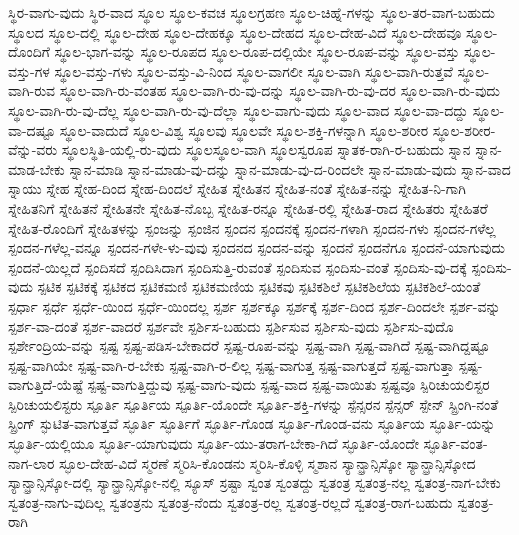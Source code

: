 {ಸ್ಥಿರ-ವಾಗು-ವುದು
ಸ್ಥಿರ-ವಾದ
ಸ್ಥೂಲ
ಸ್ಥೂಲ-ಕವಚ
ಸ್ಥೂಲಗ್ರಹಣ
ಸ್ಥೂಲ-ಚಿಹ್ನೆ-ಗಳನ್ನು
ಸ್ಥೂಲ-ತರ-ವಾಗ-ಬಹುದು
ಸ್ಥೂಲದ
ಸ್ಥೂಲ-ದಲ್ಲಿ
ಸ್ಥೂಲ-ದೇಹ
ಸ್ಥೂಲ-ದೇಹಕ್ಕೂ
ಸ್ಥೂಲ-ದೇಹದ
ಸ್ಥೂಲ-ದೇಹ-ವಿದೆ
ಸ್ಥೂಲ-ದೇಹವೂ
ಸ್ಥೂಲ-ದೊಂದಿಗೆ
ಸ್ಥೂಲ-ಭಾಗ-ವನ್ನು
ಸ್ಥೂಲ-ರೂಪದ
ಸ್ಥೂಲ-ರೂಪ-ದಲ್ಲಿಯೇ
ಸ್ಥೂಲ-ರೂಪ-ವನ್ನು
ಸ್ಥೂಲ-ವಸ್ತು
ಸ್ಥೂಲ-ವಸ್ತು-ಗಳ
ಸ್ಥೂಲ-ವಸ್ತು-ಗಳು
ಸ್ಥೂಲ-ವಸ್ತು-ವಿ-ನಿಂದ
ಸ್ಥೂಲ-ವಾಗಲೀ
ಸ್ಥೂಲ-ವಾಗಿ
ಸ್ಥೂಲ-ವಾಗಿ-ರುತ್ತವೆ
ಸ್ಥೂಲ-ವಾಗಿ-ರುವ
ಸ್ಥೂಲ-ವಾಗಿ-ರು-ವಂತಹ
ಸ್ಥೂಲ-ವಾಗಿ-ರು-ವು-ದನ್ನು
ಸ್ಥೂಲ-ವಾಗಿ-ರು-ವು-ದರ
ಸ್ಥೂಲ-ವಾಗಿ-ರು-ವುದು
ಸ್ಥೂಲ-ವಾಗಿ-ರು-ವು-ದೆಲ್ಲ
ಸ್ಥೂಲ-ವಾಗಿ-ರು-ವು-ದೆಲ್ಲಾ
ಸ್ಥೂಲ-ವಾಗು-ವುದು
ಸ್ಥೂಲ-ವಾದ
ಸ್ಥೂಲ-ವಾ-ದದ್ದು
ಸ್ಥೂಲ-ವಾ-ದಷ್ಟೂ
ಸ್ಥೂಲ-ವಾದುದೆ
ಸ್ಥೂಲ-ವಿಶ್ವ
ಸ್ಥೂಲವು
ಸ್ಥೂಲವೇ
ಸ್ಥೂಲ-ಶಕ್ತಿ-ಗಳನ್ನಾಗಿ
ಸ್ಥೂಲ-ಶರೀರ
ಸ್ಥೂಲ-ಶರೀರ-ವೆನ್ನು-ವರು
ಸ್ಥೂಲಸ್ಥಿತಿ-ಯಲ್ಲಿ-ರು-ವುದು
ಸ್ಥೂಲಸ್ಥೂಲ-ವಾಗಿ
ಸ್ಥೂಲಸ್ವರೂಪ
ಸ್ನಾತಕ-ರಾಗಿ-ರ-ಬಹುದು
ಸ್ನಾನ
ಸ್ನಾನ-ಮಾಡ-ಬೇಕು
ಸ್ನಾನ-ಮಾಡಿ
ಸ್ನಾನ-ಮಾಡು-ವು-ದನ್ನು
ಸ್ನಾನ-ಮಾಡು-ವು-ದ-ರಿಂದಲೇ
ಸ್ನಾನ-ಮಾಡು-ವುದು
ಸ್ನಾನ-ವಾದ
ಸ್ನಾಯು
ಸ್ನೇಹ
ಸ್ನೇಹ-ದಿಂದ
ಸ್ನೇಹ-ದಿಂದಲೆ
ಸ್ನೇಹಿತ
ಸ್ನೇಹಿತನ
ಸ್ನೇಹಿತ-ನಂತೆ
ಸ್ನೇಹಿತ-ನನ್ನು
ಸ್ನೇಹಿತ-ನಿ-ಗಾಗಿ
ಸ್ನೇಹಿತನಿಗೆ
ಸ್ನೇಹಿತನೆ
ಸ್ನೇಹಿತನೇ
ಸ್ನೇಹಿತ-ನೊಬ್ಬ
ಸ್ನೇಹಿತ-ರನ್ನೂ
ಸ್ನೇಹಿತ-ರಲ್ಲಿ
ಸ್ನೇಹಿತ-ರಾದ
ಸ್ನೇಹಿತರು
ಸ್ನೇಹಿತರೆ
ಸ್ನೇಹಿತ-ರೊಂದಿಗೆ
ಸ್ನೇಹಿತಳನ್ನು
ಸ್ಪಂಜನ್ನು
ಸ್ಪಂಜಿನ
ಸ್ಪಂದನ
ಸ್ಪಂದನಕ್ಕೆ
ಸ್ಪಂದನ-ಗಳಾಗಿ
ಸ್ಪಂದನ-ಗಳು
ಸ್ಪಂದನ-ಗಳೆಲ್ಲ
ಸ್ಪಂದನ-ಗಳೆಲ್ಲ-ವನ್ನೂ
ಸ್ಪಂದನ-ಗಳೇ-ಳು-ವುವು
ಸ್ಪಂದನದ
ಸ್ಪಂದನ-ವನ್ನು
ಸ್ಪಂದನೆ
ಸ್ಪಂದನೆಗೂ
ಸ್ಪಂದನೆ-ಯಾಗುವುದು
ಸ್ಪಂದನೆ-ಯಿಲ್ಲದೆ
ಸ್ಪಂದಿಸದೆ
ಸ್ಪಂದಿಸಿದಾಗ
ಸ್ಪಂದಿಸುತ್ತಿ-ರುವಂತೆ
ಸ್ಪಂದಿಸುವ
ಸ್ಪಂದಿಸು-ವಂತೆ
ಸ್ಪಂದಿಸು-ವು-ದಕ್ಕೆ
ಸ್ಪಂದಿಸು-ವುದು
ಸ್ಪಟಿಕ
ಸ್ಪಟಿಕಕ್ಕೆ
ಸ್ಪಟಿಕದ
ಸ್ಪಟಿಕಮಣಿ
ಸ್ಪಟಿಕಮಣಿಯ
ಸ್ಪಟಿಕವು
ಸ್ಪಟಿಕಶಿಲೆ
ಸ್ಪಟಿಕಶಿಲೆಯ
ಸ್ಪಟಿಕಶಿಲೆ-ಯಂತೆ
ಸ್ಪರ್ಧಾ
ಸ್ಪರ್ಧೆ
ಸ್ಪರ್ಧೆ-ಯಿಂದ
ಸ್ಪರ್ಧೆ-ಯಿಂದಲ್ಲ
ಸ್ಪರ್ಶ
ಸ್ಪರ್ಶಕ್ಕೂ
ಸ್ಪರ್ಶಕ್ಕೆ
ಸ್ಪರ್ಶ-ದಿಂದ
ಸ್ಪರ್ಶ-ದಿಂದಲೇ
ಸ್ಪರ್ಶ-ವನ್ನು
ಸ್ಪರ್ಶ-ವಾ-ದಂತೆ
ಸ್ಪರ್ಶ-ವಾದರೆ
ಸ್ಪರ್ಶವೇ
ಸ್ಪರ್ಶಿಸ-ಬಹುದು
ಸ್ಪರ್ಶಿಸುವ
ಸ್ಪರ್ಶಿಸು-ವುದು
ಸ್ಪರ್ಶಿಸು-ವುದೊ
ಸ್ಪರ್ಶೇಂದ್ರಿಯ-ವನ್ನು
ಸ್ಪಷ್ಟ
ಸ್ಪಷ್ಟ-ಪಡಿಸ-ಬೇಕಾದರೆ
ಸ್ಪಷ್ಟ-ರೂಪ-ವನ್ನು
ಸ್ಪಷ್ಟ-ವಾಗಿ
ಸ್ಪಷ್ಟ-ವಾಗಿದೆ
ಸ್ಪಷ್ಟ-ವಾಗಿದ್ದಷ್ಟೂ
ಸ್ಪಷ್ಟ-ವಾಗಿಯೇ
ಸ್ಪಷ್ಟ-ವಾಗಿ-ರ-ಬೇಕು
ಸ್ಪಷ್ಟ-ವಾಗಿ-ರ-ಲಿಲ್ಲ
ಸ್ಪಷ್ಟ-ವಾಗುತ್ತ
ಸ್ಪಷ್ಟ-ವಾಗುತ್ತದೆ
ಸ್ಪಷ್ಟ-ವಾಗುತ್ತಾ
ಸ್ಪಷ್ಟ-ವಾಗುತ್ತಿದೆ-ಯೆಷ್ಟೆ
ಸ್ಪಷ್ಟ-ವಾಗುತ್ತಿದ್ದುವು
ಸ್ಪಷ್ಟ-ವಾಗು-ವುದು
ಸ್ಪಷ್ಟ-ವಾದ
ಸ್ಪಷ್ಟ-ವಾಯಿತು
ಸ್ಪಷ್ಟವೂ
ಸ್ಪಿರಿಚುಯಲಿಸ್ಟರ
ಸ್ಪಿರಿಚುಯಲಿಸ್ಟರು
ಸ್ಪೂರ್ತಿ
ಸ್ಪೂರ್ತಿಯ
ಸ್ಪೂರ್ತಿ-ಯೊಂದೇ
ಸ್ಪೂರ್ತಿ-ಶಕ್ತಿ-ಗಳನ್ನು
ಸ್ಪೆನ್ಸರನ
ಸ್ಪೆನ್ಸರ್
ಸ್ಪೇನ್
ಸ್ಪ್ರಿಂಗಿ-ನಂತೆ
ಸ್ಪ್ರಿಂಗ್
ಸ್ಫುಟಿತ-ವಾಗುತ್ತವೆ
ಸ್ಫೂರ್ತಿ
ಸ್ಫೂರ್ತಿಗೆ
ಸ್ಫೂರ್ತಿ-ಗೊಂಡ
ಸ್ಫೂರ್ತಿ-ಗೊಂಡ-ವನು
ಸ್ಫೂರ್ತಿಯ
ಸ್ಫೂರ್ತಿ-ಯನ್ನು
ಸ್ಫೂರ್ತಿ-ಯಲ್ಲಿಯೂ
ಸ್ಫೂರ್ತಿ-ಯಾಗುವುದು
ಸ್ಫೂರ್ತಿ-ಯು-ತರಾಗ-ಬೇಕಾ-ಗಿದೆ
ಸ್ಫೂರ್ತಿ-ಯೊಂದೇ
ಸ್ಫೂರ್ತಿ-ವಂತ-ನಾಗ-ಲಾರ
ಸ್ಫೂಲ-ದೇಹ-ವಿದೆ
ಸ್ಮರಣೆ
ಸ್ಮರಿಸಿ-ಕೊಂಡನು
ಸ್ಮರಿಸಿ-ಕೊಳ್ಳಿ
ಸ್ಮಶಾನ
ಸ್ಯಾನ್ಫ್ರಾನ್ಸಿಸ್ಕೋ
ಸ್ಯಾನ್ಫ್ರಾನ್ಸಿಸ್ಕೋದ
ಸ್ಯಾನ್ಫ್ರಾನ್ಸಿಸ್ಕೋ-ದಲ್ಲಿ
ಸ್ಯಾನ್ಫ್ರಾನ್ಸಿಸ್ಕೋ-ನಲ್ಲಿ
ಸ್ಯೂಸ್
ಸ್ರಷ್ಟಾ
ಸ್ವಂತ
ಸ್ವಂತದ್ದು
ಸ್ವತಂತ್ರ
ಸ್ವತಂತ್ರ-ನಲ್ಲ
ಸ್ವತಂತ್ರ-ನಾಗ-ಬೇಕು
ಸ್ವತಂತ್ರ-ನಾಗು-ವುದಿಲ್ಲ
ಸ್ವತಂತ್ರನು
ಸ್ವತಂತ್ರ-ನೆಂದು
ಸ್ವತಂತ್ರ-ರಲ್ಲ
ಸ್ವತಂತ್ರ-ರಲ್ಲದೆ
ಸ್ವತಂತ್ರ-ರಾಗ-ಬಹುದು
ಸ್ವತಂತ್ರ-ರಾಗಿ
}
